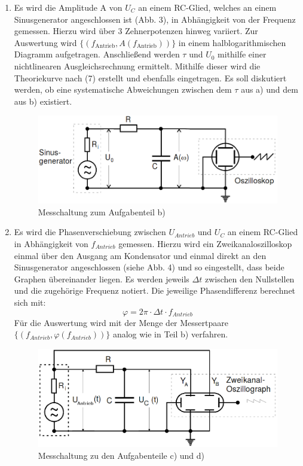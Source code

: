 \begin{enumerate}
  \item Es wird die Amplitude A von $U_C$ an einem RC-Glied, welches an einem Sinusgenerator
   angeschlossen ist (Abb. 3), in Abhängigkeit von der Frequenz gemessen. Hierzu wird über
   3 Zehnerpotenzen hinweg variiert. Zur Auswertung wird $\{(f_{\text{Antrieb}}, A(f_{\text{Antrieb}}))\}$
   in einem halblogarithmischen Diagramm aufgetragen. Anschließend werden $\tau$ und $U_0$ mithilfe einer nichtlinearen
    Ausgleichsrechnung ermittelt. Mithilfe dieser wird die Theoriekurve nach (7) erstellt und
    ebenfalls eingetragen. Es soll diskutiert werden, ob eine systematische Abweichungen
    zwischen dem $\tau$ aus a) und dem aus b) existiert.
	\begin{figure}[H]
		\centering
		\includegraphics[width=\linewidth-200pt,height=\textheight-200pt,keepaspectratio]{content/Aufgabeb.png}
		\caption{Messchaltung zum Aufgabenteil b) \cite{V353}}
		\label{fig:Aufbaua}
	\end{figure}


    \item Es wird die Phasenverschiebung zwischen $U_{Antrieb}$ und $U_C$ an einem
    RC-Glied in Abhängigkeit von $f_{Antrieb}$ gemessen. Hierzu wird ein Zweikanaloszilloskop
    einmal über den Ausgang am Kondensator und einmal direkt an den Sinusgenerator angeschlossen (siehe Abb. 4)
     und so eingestellt, dass beide Graphen übereinander liegen. Es werden jeweils
      $\Delta t$ zwischen den Nullstellen und die zugehörige Frequenz notiert. Die jeweilige
       Phasendifferenz berechnet sich mit:
       \begin{equation}
         \varphi = 2 \pi \cdot \Delta t \cdot f_{Antrieb}
       \end{equation}
       Für die Auswertung wird mit der Menge der Messertpaare $\{(f_{Antrieb}, \varphi(f_{Antrieb}))\}$
       analog wie in Teil b) verfahren.
       \begin{figure}[H]
       	\centering
       	\includegraphics[width=\linewidth-200pt,height=\textheight-200pt,keepaspectratio]{content/Aufgabec.png}
       	\caption{Messchaltung zu den Aufgabenteile c) und d) \cite{V353}}
       	\label{fig:Aufbaua}
       \end{figure}


\end{enumerate}
